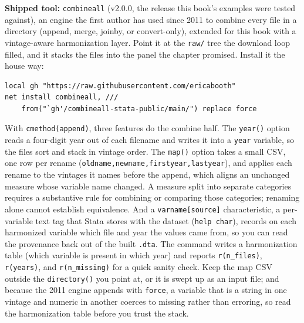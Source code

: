 \documentclass[
    a4paper,
    fontsize=10pt,
    twoside=true,
    numbers=noenddot,
]{kaobook}
\begin{document}
\begin{kaobox}[frametitle=Package Integration: \texttt{combineall}]
\textbf{Shipped tool:} \texttt{combineall} (v2.0.0, the release this book's examples were tested against), an engine the first author has used since 2011 to combine every file in a directory (append, merge, joinby, or convert-only), extended for this book with a vintage-aware harmonization layer. Point it at the \texttt{raw/} tree the download loop filled, and it stacks the files into the panel the chapter promised. Install it the house way:
\par
{\footnotesize
\begin{verbatim}
local gh "https://raw.githubusercontent.com/ericabooth"
net install combineall, ///
    from("`gh'/combineall-stata-public/main/") replace force
\end{verbatim}
}
With \texttt{cmethod(append)}, three features do the combine half. The \texttt{year()} option reads a four-digit year out of each filename and writes it into a \texttt{year} variable, so the files sort and stack in vintage order. The \texttt{map()} option takes a small CSV, one row per rename (\texttt{oldname,newname,firstyear,lastyear}), and applies each rename to the vintages it names before the append, which aligns an unchanged measure whose variable name changed. A measure split into separate categories requires a substantive rule for combining or comparing those categories; renaming alone cannot establish equivalence. And a \texttt{varname[source]} characteristic, a per-variable text tag that Stata stores with the dataset (\texttt{help char}), records on each harmonized variable which file and year the values came from, so you can read the provenance back out of the built \texttt{.dta}. The command writes a harmonization table (which variable is present in which year) and reports \texttt{r(n\_files)}, \texttt{r(years)}, and \texttt{r(n\_missing)} for a quick sanity check. Keep the map CSV outside the \texttt{directory()} you point at, or it is swept up as an input file; and because the 2011 engine appends with \texttt{force}, a variable that is a string in one vintage and numeric in another coerces to missing rather than erroring, so read the harmonization table before you trust the stack.
\end{kaobox}
\end{document}
